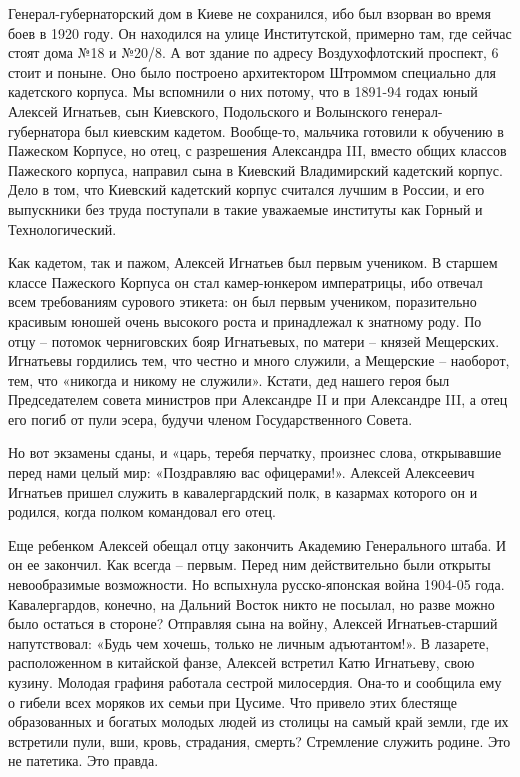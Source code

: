 \begin{multicols}{2} %
\setlength{\parindent}{0pt}


Генерал-губернаторский дом в Киеве не сохранился, ибо был взорван во время боев
в 1920 году. Он находился на улице Институтской, примерно там, где сейчас стоят
дома №18 и №20/8. А вот здание по адресу Воздухофлотский проспект, 6 стоит и
поныне. Оно было построено архитектором Штроммом специально для кадетского
корпуса. Мы вспомнили о них потому, что в 1891-94 годах юный Алексей Игнатьев,
сын Киевского, Подольского и Волынского генерал-губернатора был киевским
кадетом. Вообще-то, мальчика готовили к обучению в Пажеском Корпусе, но отец, с
разрешения Александра III, вместо общих классов Пажеского корпуса, направил
сына в Киевский Владимирский кадетский корпус. Дело в том, что Киевский
кадетский корпус считался лучшим в России, и его выпускники без труда поступали
в такие уважаемые институты как Горный и Технологический. 

Как кадетом, так и пажом, Алексей Игнатьев был первым учеником. В старшем
классе Пажеского Корпуса он стал камер-юнкером императрицы, ибо отвечал всем
требованиям сурового этикета: он был первым учеником, поразительно красивым
юношей очень высокого роста и принадлежал к знатному роду. По отцу – потомок
черниговских бояр Игнатьевых, по матери – князей Мещерских. Игнатьевы гордились
тем, что честно и много служили, а Мещерские – наоборот, тем, что «никогда и
никому не служили». Кстати, дед нашего героя был Председателем совета министров
при Александре II и при Александре III, а отец его погиб от пули эсера, будучи
членом Государственного Совета. 

\end{multicols} %

Но вот экзамены сданы, и «царь, теребя перчатку, произнес слова, открывавшие
перед нами целый мир: «Поздравляю вас офицерами!». Алексей Алексеевич Игнатьев
пришел служить в кавалергардский полк, в казармах которого он и родился, когда
полком командовал его отец.  


Еще ребенком Алексей обещал отцу закончить Академию Генерального штаба. И он ее
закончил. Как всегда – первым. Перед ним действительно были открыты
невообразимые возможности. Но вспыхнула русско-японская война 1904-05 года.
Кавалергардов, конечно, на Дальний Восток никто не посылал, но разве можно было
остаться в стороне? Отправляя сына на войну, Алексей Игнатьев-старший
напутствовал: «Будь чем хочешь, только не личным адъютантом!». В лазарете,
расположенном в китайской фанзе, Алексей встретил Катю Игнатьеву, свою кузину.
Молодая графиня работала сестрой милосердия. Она-то и сообщила ему о гибели
всех моряков их семьи при Цусиме. Что привело этих блестяще образованных и
богатых молодых людей из столицы на самый край земли, где их встретили пули,
вши, кровь, страдания, смерть? Стремление служить родине. Это не патетика. Это
правда.    

